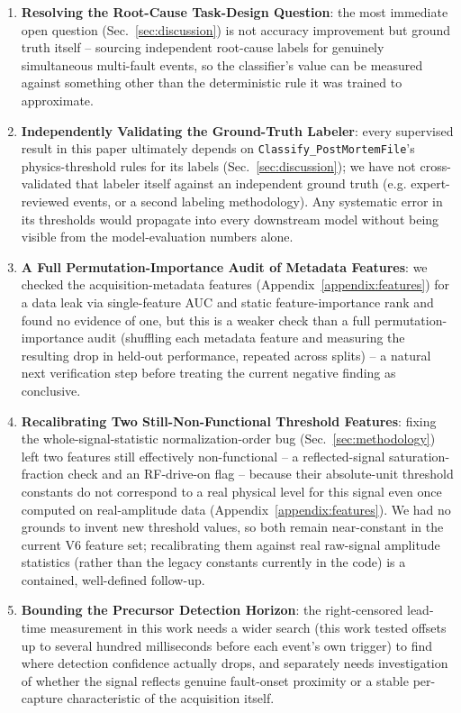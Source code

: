 \begin{enumerate}
    \item \textbf{Resolving the Root-Cause Task-Design Question}: the most immediate open question (Sec.~\ref{sec:discussion}) is not accuracy improvement but ground truth itself -- sourcing independent root-cause labels for genuinely simultaneous multi-fault events, so the classifier's value can be measured against something other than the deterministic rule it was trained to approximate.

    \item \textbf{Independently Validating the Ground-Truth Labeler}: every supervised result in this paper ultimately depends on \texttt{Classify\_PostMortemFile}'s physics-threshold rules for its labels (Sec.~\ref{sec:discussion}); we have not cross-validated that labeler itself against an independent ground truth (e.g. expert-reviewed events, or a second labeling methodology). Any systematic error in its thresholds would propagate into every downstream model without being visible from the model-evaluation numbers alone.

    \item \textbf{A Full Permutation-Importance Audit of Metadata Features}: we checked the acquisition-metadata features (Appendix~\ref{appendix:features}) for a data leak via single-feature AUC and static feature-importance rank and found no evidence of one, but this is a weaker check than a full permutation-importance audit (shuffling each metadata feature and measuring the resulting drop in held-out performance, repeated across splits) -- a natural next verification step before treating the current negative finding as conclusive.

    \item \textbf{Recalibrating Two Still-Non-Functional Threshold Features}: fixing the whole-signal-statistic normalization-order bug (Sec.~\ref{sec:methodology}) left two features still effectively non-functional -- a reflected-signal saturation-fraction check and an RF-drive-on flag -- because their absolute-unit threshold constants do not correspond to a real physical level for this signal even once computed on real-amplitude data (Appendix~\ref{appendix:features}). We had no grounds to invent new threshold values, so both remain near-constant in the current V6 feature set; recalibrating them against real raw-signal amplitude statistics (rather than the legacy constants currently in the code) is a contained, well-defined follow-up.

    \item \textbf{Bounding the Precursor Detection Horizon}: the right-censored lead-time measurement in this work needs a wider search (this work tested offsets up to several hundred milliseconds before each event's own trigger) to find where detection confidence actually drops, and separately needs investigation of whether the signal reflects genuine fault-onset proximity or a stable per-capture characteristic of the acquisition itself.


\end{enumerate}
